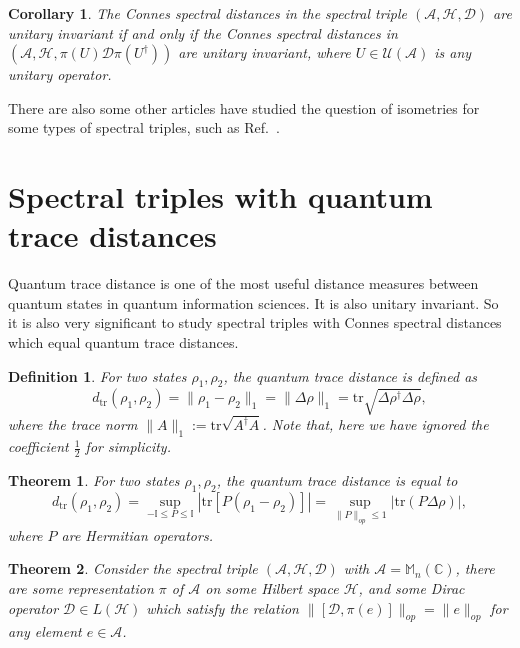 \documentclass[a4paper,12pt]{article}
\newtheorem{corollary}{Corollary}
\newtheorem{definition}{Definition}
\newtheorem{theorem}{Theorem}
\begin{document}
\begin{corollary}
  The Connes spectral distances in the spectral triple $(\mathcal{A},
  \mathcal{H}, \mathcal{D})$ are unitary invariant if and only if the Connes
  spectral distances in $(\mathcal{A}, \mathcal{H}, \pi (U)\mathcal{D} \pi
  (U^{\dag}))$ are unitary invariant, where $U \in \mathcal{U} (\mathcal{A})$
  is any unitary operator.
\end{corollary}

There are also some other articles have studied the question of isometries for some types of spectral triples, such as Ref.~\cite{Bassi}.




\section{Spectral triples with quantum trace distances}\label{sec5}

Quantum trace distance is one of the most useful distance measures between
quantum states in quantum information sciences. It is also unitary invariant.
So it is also very significant to study spectral triples with Connes spectral
distances which equal quantum trace distances.

\begin{definition}
  \cite{Nielsen} For two states $\rho_1, \rho_2$, the quantum trace distance
  is defined as
  \begin{equation}
    d_{\mathrm{tr}} (\rho_1, \rho_2) = \| \rho_1 - \rho_2 \|_1 = \| \Delta
    \rho \|_1 = \mathrm{tr} \sqrt{\Delta \rho^{\dag} \Delta \rho},
  \end{equation}
  where the trace norm $\|A\|_1 := \mathrm{tr} \sqrt{A^{\dag} A}$. Note that,
  here we have ignored the coefficient $\frac{1}{2}$ for simplicity.
\end{definition}

\begin{theorem}\label{dtr}
  \cite{Nielsen} For two states $\rho_1, \rho_2$, the quantum trace distance
  is equal to
  \begin{equation}
    d_{\mathrm{tr}} (\rho_1, \rho_2) = \sup_{-\mathbb{I} \leqslant P \leqslant
    \mathbb{I}} \left| \mathrm{tr} [P (\rho_1 - \rho_2)] \right| = \sup_{\|P\|_{op}
    \leqslant 1} | \mathrm{tr} (P \Delta \rho) |,
  \end{equation}
  where $P$ are Hermitian operators.
\end{theorem}

\begin{theorem}
  Consider the spectral triple $(\mathcal{A}, \mathcal{H}, \mathcal{D})$ with
  $\mathcal{A}=\mathbb{M}_n (\mathbb{C})$, there are some
  representation $\pi$ of $\mathcal{A}$ on some Hilbert space $\mathcal{H}$,
  and some Dirac operator $\mathcal{D} \in L (\mathcal{H})$ which satisfy the
  relation $\|[\mathcal{D}, \pi (e)]\|_{op} = \|e\|_{op}$ for any element $e
  \in \mathcal{A}$.
\end{theorem}
\end{document}
